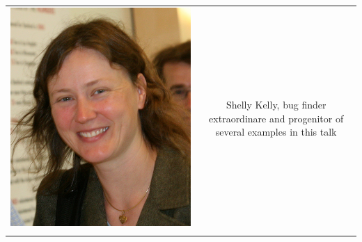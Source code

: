 \documentclass[10pt, xcolor=x11names, compress]{beamer}
\begin{document}
\begin{frame}
\begin{tabular}{cc}
\begin{minipage}{0.1\linewidth}
      \includegraphics[width=\linewidth]{mugs/shelly.jpg}
    \end{minipage}&
    \begin{minipage}{0.7\linewidth}
      Shelly Kelly, bug finder extraordinare and progenitor of several
      examples in this talk
    \end{minipage} \\
    \begin{minipage}{0.1\linewidth}

\end{minipage}
\end{tabular}
\end{frame}
\end{document}
